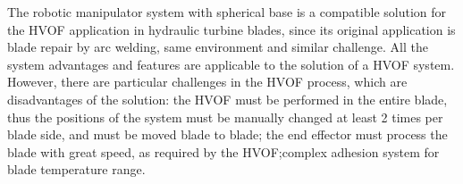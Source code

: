 


The robotic manipulator system with spherical base is a compatible solution
for the HVOF application in hydraulic turbine blades, since its
original application is blade repair by arc welding, same environment and
similar challenge. All the system advantages and features are applicable to
the solution of a HVOF system. However, there are particular challenges in the
HVOF process, which are disadvantages of the solution: the HVOF must be
performed in the entire blade, thus the positions of the system must be
manually changed at least 2 times per blade side, and must be moved blade to
blade; the end effector must process the blade with great speed, as required
by the HVOF;complex adhesion system for blade temperature range.

